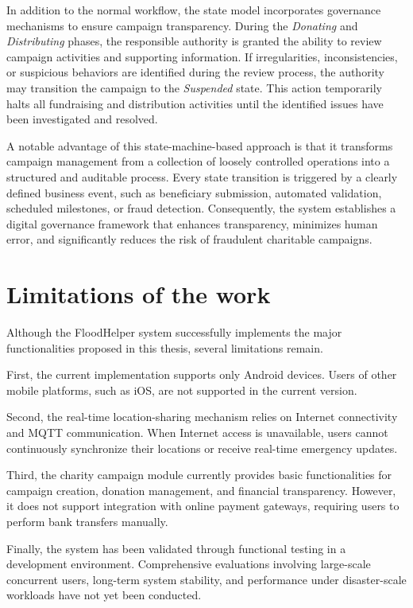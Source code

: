 \documentclass[../Main.tex]{subfiles}
\begin{document}
In addition to the normal workflow, the state model incorporates governance mechanisms to ensure campaign transparency. During the \textit{Donating} and \textit{Distributing} phases, the responsible authority is granted the ability to review campaign activities and supporting information. If irregularities, inconsistencies, or suspicious behaviors are identified during the review process, the authority may transition the campaign to the \textit{Suspended} state. This action temporarily halts all fundraising and distribution activities until the identified issues have been investigated and resolved.

A notable advantage of this state-machine-based approach is that it transforms campaign management from a collection of loosely controlled operations into a structured and auditable process. Every state transition is triggered by a clearly defined business event, such as beneficiary submission, automated validation, scheduled milestones, or fraud detection. Consequently, the system establishes a digital governance framework that enhances transparency, minimizes human error, and significantly reduces the risk of fraudulent charitable campaigns.

\section{Limitations of the work}

Although the FloodHelper system successfully implements the major functionalities proposed in this thesis, several limitations remain.

First, the current implementation supports only Android devices. Users of other mobile platforms, such as iOS, are not supported in the current version.

Second, the real-time location-sharing mechanism relies on Internet connectivity and MQTT communication. When Internet access is unavailable, users cannot continuously synchronize their locations or receive real-time emergency updates.

Third, the charity campaign module currently provides basic functionalities for campaign creation, donation management, and financial transparency. However, it does not support integration with online payment gateways, requiring users to perform bank transfers manually.

Finally, the system has been validated through functional testing in a development environment. Comprehensive evaluations involving large-scale concurrent users, long-term system stability, and performance under disaster-scale workloads have not yet been conducted.
\end{document}
